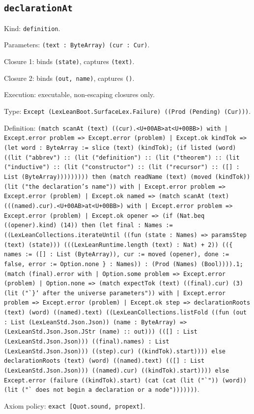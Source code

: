 \documentclass[11pt]{article}
\begin{document}
\subsection*{\texttt{declarationAt}}
\noindent Kind: \texttt{definition}.\par
\noindent Parameters: \texttt{(text : ByteArray) (cur : Cur)}.\par
\noindent Closure 1: binds \texttt{(state)}, captures \texttt{(text)}.\par
\noindent Closure 2: binds \texttt{(out, name)}, captures \texttt{()}.\par
\noindent Execution: executable, non-escaping closures only.\par
\noindent Type: \texttt{Except (LexLeanBoot.SurfaceLex.Failure) ((Prod (Pending) (Cur)))}.\par
\noindent Definition: \texttt{(match scanAt (text) ((cur).<U+00AB>at<U+00BB>) with | Except.error problem => Except.error (problem) | Except.ok kindTok => (let word : ByteArray := slice (text) (kindTok); (if listed (word) ((lit ("abbrev") :: (lit ("definition") :: (lit ("theorem") :: (lit ("inductive") :: (lit ("constructor") :: (lit ("recursor") :: ([] : List (ByteArray))))))))) then (match readName (text) (moved (kindTok)) (lit ("the declaration's name")) with | Except.error problem => Except.error (problem) | Except.ok named => (match scanAt (text) (((named).cur).<U+00AB>at<U+00BB>) with | Except.error problem => Except.error (problem) | Except.ok opener => (if (Nat.beq ((opener).kind) (14)) then (let final : Names := ((LexLeanCollections.iterateUntil ((fun (state : Names) => paramsStep (text) (state))) (((LexLeanRuntime.length (text) : Nat) + 2)) ((\{ names := ([] : List (ByteArray)), cur := moved (opener), done := false, error := Option.none \} : Names)) : (Prod (Names) (Bool)))).1; (match (final).error with | Option.some problem => Except.error (problem) | Option.none => (match expectTok (text) ((final).cur) (3) (lit ("`\}` after the universe parameters")) with | Except.error problem => Except.error (problem) | Except.ok step => declarationRoots (text) (word) ((named).text) ((LexLeanCollections.listFold ((fun (out : List (LexLeanStd.Json.Json)) (name : ByteArray) => (LexLeanStd.Json.Json.JStr (name) :: out))) (([] : List (LexLeanStd.Json.Json))) ((final).names) : List (LexLeanStd.Json.Json))) ((step).cur) ((kindTok).start)))) else declarationRoots (text) (word) ((named).text) (([] : List (LexLeanStd.Json.Json))) ((named).cur) ((kindTok).start)))) else Except.error (failure ((kindTok).start) (cat (cat (lit ("`")) (word)) (lit ("` does not begin a declaration or a node")))))))}.\par
\noindent Axiom policy: \texttt{exact [Quot.sound, propext]}.\par
\end{document}
